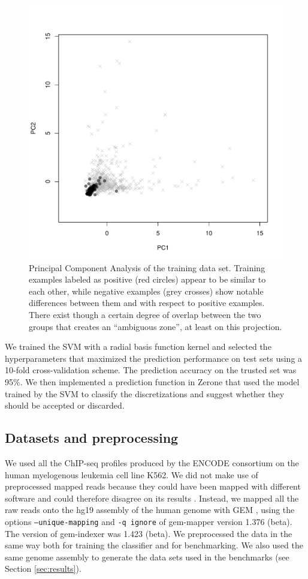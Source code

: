 \documentclass{bioinfo}
\begin{document}
\begin{methods}
\begin{figure}[!tpb]
\centerline{\includegraphics[scale=0.5]{pca_bw.pdf}}
\caption{Principal Component Analysis of the training data set.
Training examples labeled as positive (red circles) appear to be similar to
each other, while negative examples (grey crosses) show notable differences
between them and with respect to positive examples. There exist though a
certain degree of overlap between the two groups that creates an
``ambiguous zone'', at least on this projection.
}\label{fig:pca_bw}
\end{figure}

We trained the SVM with a radial basis function kernel and
selected the hyperparameters that maximized the prediction
performance on test sets using a 10-fold cross-validation scheme.
The prediction accuracy on the trusted set was 95\%.
We then implemented a prediction function in Zerone that used the
model trained by the SVM to classify the discretizations and
suggest whether they should be accepted or discarded.

\subsection{Datasets and preprocessing}
We used all the ChIP-seq profiles produced by the ENCODE consortium
on the human myelogenous leukemia cell line K562. We did not make use
of preprocessed mapped reads because they could have been mapped with
different software and could therefore disagree on its results
\citep{pmid21059603}. Instead, we mapped all the raw reads onto the
hg19 assembly of the human genome with GEM \citep{pmid23103880}, using
the options \texttt{--unique-mapping} and \texttt{-q ignore} of gem-mapper
version 1.376 (beta). The version of gem-indexer was 1.423 (beta). We
preprocessed the data in the same way both for training the classifier
and for benchmarking. We also used the same genome assembly to generate
the data sets used in the benchmarks (see Section \ref{sec:results}).


\end{methods}
\end{document}
